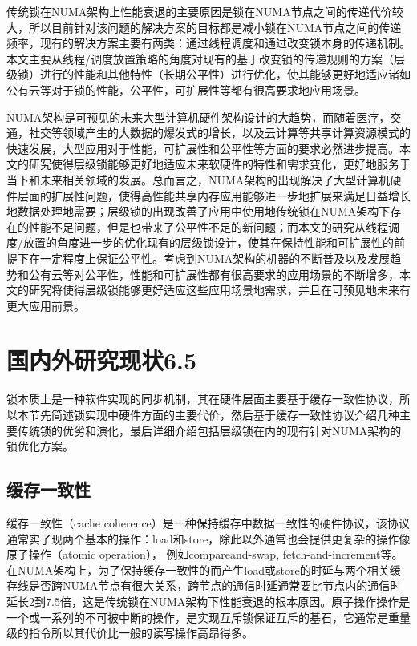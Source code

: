 传统锁在NUMA架构上性能衰退的主要原因是锁在NUMA节点之间的传递代价较大，所以目前针对该问题的解决方案的目标都是减小锁在NUMA节点之间的传递频率，现有的解决方案主要有两类：通过线程调度和通过改变锁本身的传递机制。本文主要从线程/调度放置策略的角度对现有的基于改变锁的传递规则的方案（层级锁）进行的性能和其他特性（长期公平性）进行优化，使其能够更好地适应诸如公有云等对于锁的性能，公平性，可扩展性等都有很高要求地应用场景。

NUMA架构是可预见的未来大型计算机硬件架构设计的大趋势，而随着医疗，交通，社交等领域产生的大数据的爆发式的增长，以及云计算等共享计算资源模式的快速发展，大型应用对于性能，可扩展性和公平性等方面的要求必然进步提高。本文的研究使得层级锁能够更好地适应未来软硬件的特性和需求变化，更好地服务于当下和未来相关领域的发展。总而言之，NUMA架构的出现解决了大型计算机硬件层面的扩展性问题，使得高性能共享内存应用能够进一步地扩展来满足日益增长地数据处理地需要；层级锁的出现改善了应用中使用地传统锁在NUMA架构下存在的性能不足问题，但是也带来了公平性不足的新问题；而本文的研究从线程调度/放置的角度进一步的优化现有的层级锁设计，使其在保持性能和可扩展性的前提下在一定程度上保证公平性。考虑到NUMA架构的机器的不断普及以及发展趋势和公有云等对公平性，性能和可扩展性都有很高要求的应用场景的不断增多，本文的研究将使得层级锁能够更好适应这些应用场景地需求，并且在可预见地未来有更大应用前景。
\section{国内外研究现状6.5}
锁本质上是一种软件实现的同步机制，其在硬件层面主要基于缓存一致性协议，所以本节先简述锁实现中硬件方面的主要代价\cite{david2013everything}，然后基于缓存一致性协议介绍几种主要传统锁的优劣和演化，最后详细介绍包括层级锁在内的现有针对NUMA架构的锁优化方案。
\subsection{缓存一致性}
缓存一致性（cache coherence）是一种保持缓存中数据一致性的硬件协议，该协议通常实了现两个基本的操作：load和store，除此以外通常也会提供更复杂的操作像原子操作（atomic operation）， 例如compareand-swap,
fetch-and-increment等。在NUMA架构上，为了保持缓存一致性的而产生load或store的时延与两个相关缓存线是否跨NUMA节点有很大关系，跨节点的通信时延通常要比节点内的通信时延长2到7.5倍\cite{david2013everything}，这是传统锁在NUMA架构下性能衰退的根本原因。原子操作操作是一个或一系列的不可被中断的操作，是实现互斥锁保证互斥的基石，它通常是重量级的指令所以其代价比一般的读写操作高昂得多。

